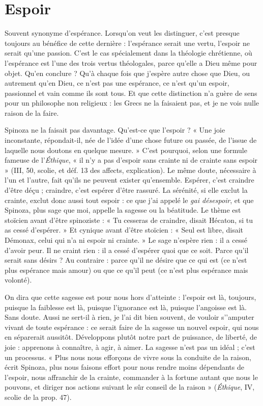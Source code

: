 \section{Espoir}
Souvent synonyme d’espérance. Lorsqu'on veut les distinguer, c’est
presque toujours au bénéfice de cette dernière : l’espérance serait
une vertu, l'espoir ne serait qu’une passion. C’est le cas spécialement dans la
théologie chrétienne, où l’espérance est l’une des trois vertus théologales, parce
qu'elle a Dieu même pour objet. Qu’en conclure ? Qu’à chaque fois que
j'espère autre chose que Dieu, ou autrement qu’en Dieu, ce n’est pas une espérance,
ce n’est qu’un espoir, passionnel et vain comme ils sont tous. Et que
cette distinction n’a guère de sens pour un philosophe non religieux : les Grecs
ne la faisaient pas, et je ne vois nulle raison de la faire.

Spinoza ne la faisait pas davantage. Qu'est-ce que l'espoir ? « Une joie
inconstante, répon\-dait-il, née de l’idée d’une chose future ou passée, de l’issue
de laquelle nous doutons en quelque mesure. » C’est pourquoi, selon une formule
fameuse de l’{\it Éthique}, « il n’y a pas d’espoir sans crainte ni de crainte sans
espoir » (III, 50, scolie, et déf. 13 des affects, explication). Le même doute,
nécessaire à l’un et l’autre, fait qu’ils ne peuvent exister qu’ensemble. Espérer,
c'est craindre d’être déçu ; craindre, c’est espérer d’être rassuré. La sérénité, si
elle exclut la crainte, exclut donc aussi tout espoir : ce que j’ai appelé le {\it gai
désespoir}, et que Spinoza, plus sage que moi, appelle la sagesse ou la béatitude.
Le thème est stoïcien avant d’être spinoziste : « Tu cesseras de craindre, disait
Hécaton, si tu as cessé d’espérer. » Et cynique avant d’être stoïcien : « Seul est
libre, disait Démonax, celui qui n’a ni espoir ni crainte. » Le sage n’espère rien :
il a cessé d’avoir peur. Il ne craint rien : il a cessé d’espérer quoi que ce soit.
Parce qu’il serait sans désirs ? Au contraire : parce qu’il ne désire que ce qui est
(ce n’est plus espérance mais amour) ou que ce qu’il peut (ce n’est plus espérance
mais volonté).

On dira que cette sagesse est pour nous hors d’atteinte : l'espoir est là, toujours,
puisque la faiblesse est là, puisque l'ignorance est là, puisque l’angoisse
est là. Sans doute. Aussi ne sert-il à rien, je l’ai dit bien souvent, de vouloir
s’'amputer vivant de toute espérance : ce serait faire de la sagesse un nouvel
espoir, qui nous en séparerait aussitôt. Développons plutôt notre part de puissance,
de liberté, de joie : apprenons à connaître, à agir, à aimer. La sagesse
n’est pas un idéal ; c’est un processus. « Plus nous nous efforçons de vivre sous
la conduite de la raison, écrit Spinoza, plus nous faisons effort pour nous
rendre moins dépendants de l'espoir, nous affranchir de la crainte, commander
à la fortune autant que nous le pouvons, et diriger nos actions suivant le sûr
conseil de la raison » ({\it Éthique}, IV, scolie de la prop. 47).

